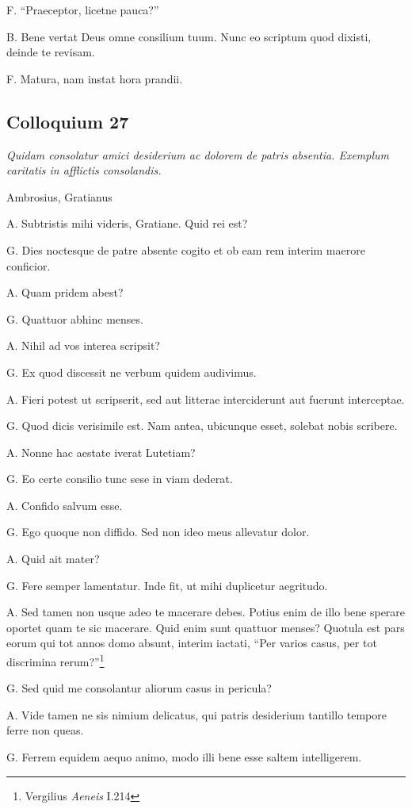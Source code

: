 \documentclass{article}
\begin{document}
F. ``Praeceptor, licetne pauca?''

B. Bene vertat Deus omne consilium tuum. Nunc eo scriptum quod dixisti, deinde te revisam.

F. Matura, nam instat hora prandii.

\subsection{Colloquium 27}
\emph{Quidam consolatur amici desiderium ac dolorem de patris absentia. Exemplum caritatis in afflictis consolandis.}

Ambrosius, Gratianus

A. Subtristis mihi videris, Gratiane. Quid rei est?

G. Dies noctesque de patre absente cogito et ob eam rem interim maerore conficior.

A. Quam pridem abest?

G. Quattuor abhinc menses.

A. Nihil ad vos interea scripsit?

G. Ex quod discessit ne verbum quidem audivimus.

A. Fieri potest ut scripserit, sed aut litterae interciderunt aut fuerunt interceptae.

G. Quod dicis verisimile est. Nam antea, ubicunque esset, solebat nobis scribere.

A. Nonne hac aestate iverat Lutetiam?

G. Eo certe consilio tunc sese in viam dederat.

A. Confido salvum esse.

G. Ego quoque non diffido. Sed non ideo meus allevatur dolor.

A. Quid ait mater?

G. Fere semper lamentatur. Inde fit, ut mihi duplicetur aegritudo.

A. Sed tamen non usque adeo te macerare debes. Potius enim de illo bene sperare oportet quam te sic macerare. Quid enim sunt quattuor menses? Quotula est pars eorum qui tot annos domo absunt, interim iactati, ``Per varios casus, per tot discrimina rerum?''\footnote{Vergilius \emph{Aeneis} I.214}

G. Sed quid me consolantur aliorum casus in pericula?

A. Vide tamen ne sis nimium delicatus, qui patris desiderium tantillo tempore ferre non queas.

G. Ferrem equidem aequo animo, modo illi bene esse saltem intelligerem.
\end{document}
